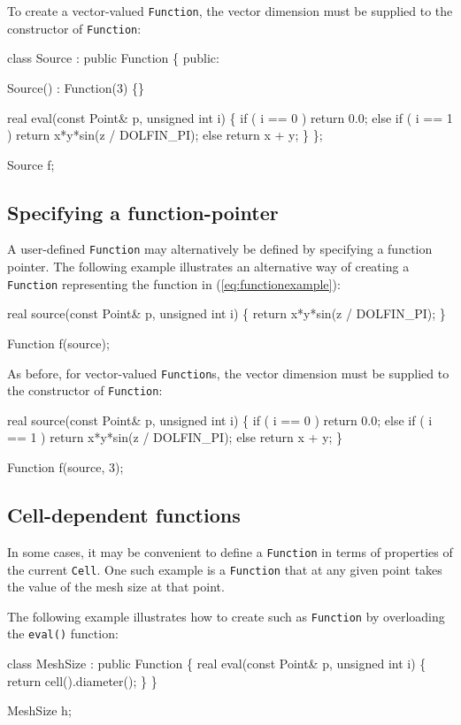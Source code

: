 To create a vector-valued \texttt{Function}, the vector dimension must
be supplied to the constructor of \texttt{Function}:
\begin{code}
  class Source : public Function
  \{
  public:

    Source() : Function(3) \{\}

    real eval(const Point& p, unsigned int i)
    \{
      if ( i == 0 )
        return 0.0;
      else if ( i == 1 )
        return x*y*sin(z / DOLFIN_PI);
      else
        return x + y;
    \}
  \};

  Source f;
\end{code}

\subsection{Specifying a function-pointer}

A user-defined \texttt{Function} may alternatively be defined by
specifying a function pointer. The following example illustrates
an alternative way of creating a \texttt{Function} representing the
function in (\ref{eq:functionexample}):
\begin{code}
  real source(const Point& p, unsigned int i)
  \{
    return x*y*sin(z / DOLFIN_PI);
  \}

  Function f(source);
\end{code}

As before, for vector-valued \texttt{Function}s, the vector dimension
must be supplied to the constructor of \texttt{Function}:
\begin{code}
  real source(const Point& p, unsigned int i)
  \{
    if ( i == 0 )
      return 0.0;
    else if ( i == 1 )
      return x*y*sin(z / DOLFIN_PI);
    else
      return x + y;
  \}
  
  Function f(source, 3);
\end{code}

\subsection{Cell-dependent functions}

In some cases, it may be convenient to define a \texttt{Function} in
terms of properties of the current \texttt{Cell}. One such example is
a \texttt{Function} that at any given point takes the value of the
mesh size at that point.

The following example illustrates how to create such as
\texttt{Function} by overloading the \texttt{eval()} function:
\begin{code}
  class MeshSize : public Function
  \{
    real eval(const Point& p, unsigned int i)
    \{
      return cell().diameter();
    \}
  \}

  MeshSize h;
\end{code}

